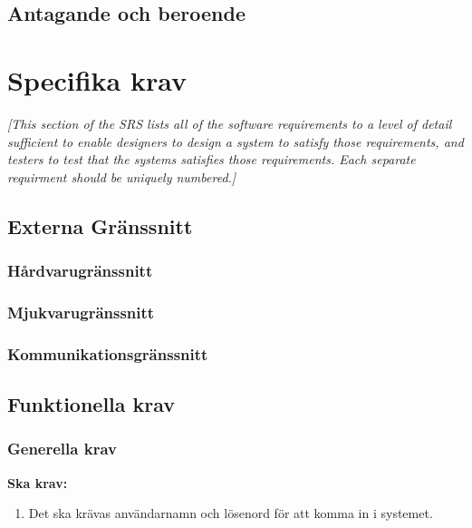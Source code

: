 \documentclass{article}
\begin{document}
\begin{enumerate}
\subsection{Antagande och beroende}
\label{subsec:Antagande och beroende}

\section{Specifika krav}
\label{sec:Specifika krav}
\emph{[This section of the \ac{SRS} lists all of the software requirements to
  a level of detail sufficient to enable designers to design a system to
  satisfy those requirements, and testers to test that the systems satisfies
  those requirements. Each separate requirment should be uniquely numbered.]}

\subsection{Externa Gränssnitt}
\label{subsec:Externa Granssnitt}
\subsubsection{Hårdvarugränssnitt}
\label{subsec:EG-Hardvarugranssnitt}
\subsubsection{Mjukvarugränssnitt}
\label{subsec:EG-Mjukvarugranssnitt}
\subsubsection{Kommunikationsgränssnitt}
\label{subsec:EG-Kommunikationsgranssnitt}
\subsection{Funktionella krav}
\label{subsec:Funktionella krav}
\subsubsection{Generella krav}
\label{subsec:Generella krav}
\textbf{Ska krav: }
\begin{enumerate}
    \item Det ska krävas användarnamn och lösenord för att komma in i systemet.
\end{enumerate}


\end{enumerate}
\end{document}
